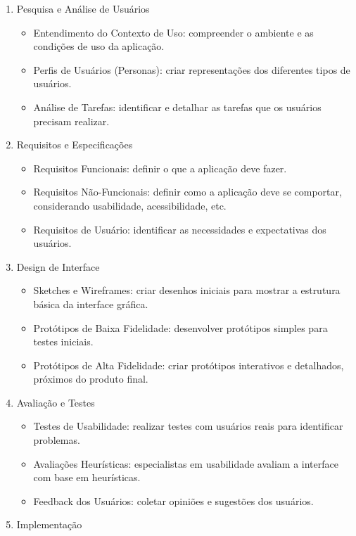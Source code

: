 \documentclass[
  12pt,
  openright,
  twoside,
  a4paper,
  english,
  french,
  spanish,
  brazil
]{abntex2}
\begin{document}
\begin{enumerate}
  \item Pesquisa e Análise de Usuários
  \begin{itemize}
    \item
      Entendimento do Contexto de Uso: compreender o ambiente e as condições de
      uso da aplicação.
    \item
      Perfis de Usuários (Personas): criar representações dos diferentes tipos
      de usuários.
    \item
      Análise de Tarefas: identificar e detalhar as tarefas que os usuários
      precisam realizar.
  \end{itemize}
  \item Requisitos e Especificações
  \begin{itemize}
    \item Requisitos Funcionais: definir o que a aplicação deve fazer.
    \item
      Requisitos Não-Funcionais: definir como a aplicação deve se comportar,
      considerando usabilidade, acessibilidade, etc.
    \item
      Requisitos de Usuário: identificar as necessidades e expectativas dos
      usuários.
  \end{itemize}
  \item Design de Interface
  \begin{itemize}
    \item
      Sketches e Wireframes: criar desenhos iniciais para mostrar a estrutura
      básica da interface gráfica.
    \item
      Protótipos de Baixa Fidelidade: desenvolver protótipos simples para testes
      iniciais.
    \item
      Protótipos de Alta Fidelidade: criar protótipos interativos e detalhados,
      próximos do produto final.
  \end{itemize}
  \item Avaliação e Testes
  \begin{itemize}
    \item
      Testes de Usabilidade: realizar testes com usuários reais para identificar
      problemas.
    \item
      Avaliações Heurísticas: especialistas em usabilidade avaliam a interface
      com base em heurísticas.
    \item Feedback dos Usuários: coletar opiniões e sugestões dos usuários.
  \end{itemize}
  \item Implementação

\end{enumerate}
\end{document}
